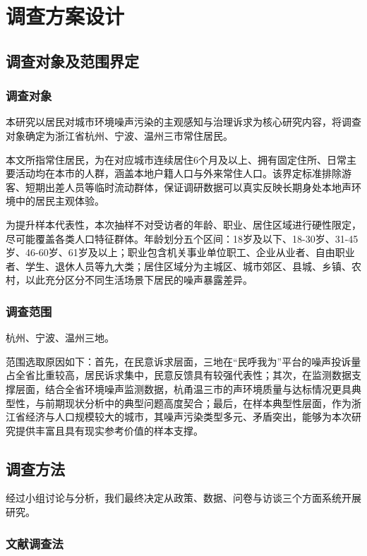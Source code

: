 \section{调查方案设计}

\subsection{调查对象及范围界定}

\subsubsection{调查对象}

本研究以居民对城市环境噪声污染的主观感知与治理诉求为核心研究内容，将调查对象确定为浙江省杭州、宁波、温州三市常住居民。

本文所指常住居民，为在对应城市连续居住6个月及以上、拥有固定住所、日常主要活动均在本市的人群，涵盖本地户籍人口与外来常住人口。该界定标准排除游客、短期出差人员等临时流动群体，保证调研数据可以真实反映长期身处本地声环境中的居民主观体验。

为提升样本代表性，本次抽样不对受访者的年龄、职业、居住区域进行硬性限定，尽可能覆盖各类人口特征群体。年龄划分五个区间：18岁及以下、18-30岁、31-45岁、46-60岁、61岁及以上；职业包含机关事业单位职工、企业从业者、自由职业者、学生、退休人员等九大类；居住区域分为主城区、城市郊区、县城、乡镇、农村，以此充分区分不同生活场景下居民的噪声暴露差异。

\subsubsection{调查范围}

杭州、宁波、温州三地。

范围选取原因如下：首先，在民意诉求层面，三地在“民呼我为”平台的噪声投诉量占全省比重较高，居民诉求集中，民意反馈具有较强代表性；其次，在监测数据支撑层面，结合全省环境噪声监测数据，杭甬温三市的声环境质量与达标情况更具典型性，与前期现状分析中的典型问题高度契合；最后，在样本典型性层面，作为浙江省经济与人口规模较大的城市，其噪声污染类型多元、矛盾突出，能够为本次研究提供丰富且具有现实参考价值的样本支撑。

\subsection{调查方法}

经过小组讨论与分析，我们最终决定从政策、数据、问卷与访谈三个方面系统开展研究。

\subsubsection{文献调查法}


